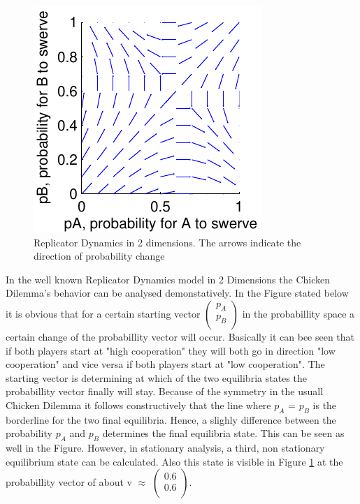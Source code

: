 \documentclass[11pt]{article}
\begin{document}
\begin{figure}[h]
\centering
\includegraphics[scale=1.5]{ReplicatorDynamics2Dimensions.pdf}
\caption[]{Replicator Dynamics in 2 dimensions. The arrows indicate the direction of probability change}
\label{Rep2}
\end{figure}


In the well known Replicator Dynamics model in 2 Dimensions the Chicken Dilemma's behavior can be analysed demonstatively. In the Figure stated below it is obvious that for a certain starting vector $\left( \begin{array}{c} p_A \\ p_B \\ \end{array} \right) $ in the probabillity space a certain change of the probabillity vector will occur. Basically it can bee seen that if both players start at "high cooperation" they will both go in direction "low cooperation" and vice versa if both players start at "low cooperation". 
The starting vector is determining at which of the two equilibria states the probabillity vector finally will stay. Because of the symmetry in the usuall Chicken Dilemma it follows constructively that the line where $p_A$ = $p_B$ is the borderline for the two final equilibria. Hence, a slighly difference between the probability $p_A$ and $p_B$ determines the final equilibria state. This can be seen as well in the Figure. 
However, in stationary analysis, a third, non stationary equilibrium state can be calculated. Also this state is visible in Figure \ref{Rep2} at the probabillity vector of about v $\approx$ $\left( \begin{array}{c} 0.6 \\  0.6 \\ \end{array} \right) $. 
\newline
\end{document}
